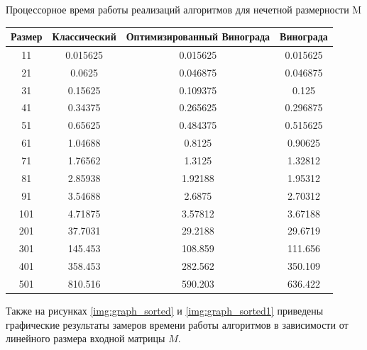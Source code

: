 \begin{center}
\begin{threeparttable}
	\end{threeparttable}
\newpage
\begin{threeparttable}
	\caption{Процессорное время работы реализаций алгоритмов для нечетной размерности M}
	\label{tbl:best1}
	\begin{tabular}{|c|c|c|c|}
		\hline
		Размер & Классический &  Оптимизированный Винограда  &  Винограда\\
		\hline
		11 &  0.015625 &      0.015625      & 0.015625 \\ 
		\hline
		21 &  0.0625    &   0.046875       &0.046875  \\ 
		\hline
		31 & 0.15625     &  0.109375        &  0.125  \\ 
		\hline
		41 &  0.34375     &  0.265625      & 0.296875  \\ 
		\hline
		51 & 0.65625       &0.484375      & 0.515625   \\ 
		\hline
		61 &  1.04688       &  0.8125    &    0.90625  \\ 
		\hline
		71 &  1.76562        & 1.3125   &     1.32812  \\ 
		\hline
		81 &   2.85938        &1.92188 &       1.95312 \\ 
		\hline
		91 & 3.54688   &      2.6875  &      2.70312   \\ 
		\hline
		101 & 4.71875   &     3.57812       & 3.67188  \\ 
		\hline
		201 &  37.7031   &     29.2188     &   29.6719  \\ 
		\hline
		301 & 145.453     &   108.859     &   111.656  \\ 
		\hline
		401 &  358.453     &   282.562   &     350.109 \\ 
		\hline
		501 &  810.516      &  590.203  &      636.422  \\ 
		\hline
	\end{tabular}
	
\end{threeparttable}
\end{center}

Также на рисунках \ref{img:graph_sorted} и \ref{img:graph_sorted1} приведены графические результаты замеров времени работы алгоритмов в зависимости от линейного размера входной матрицы $M$.

